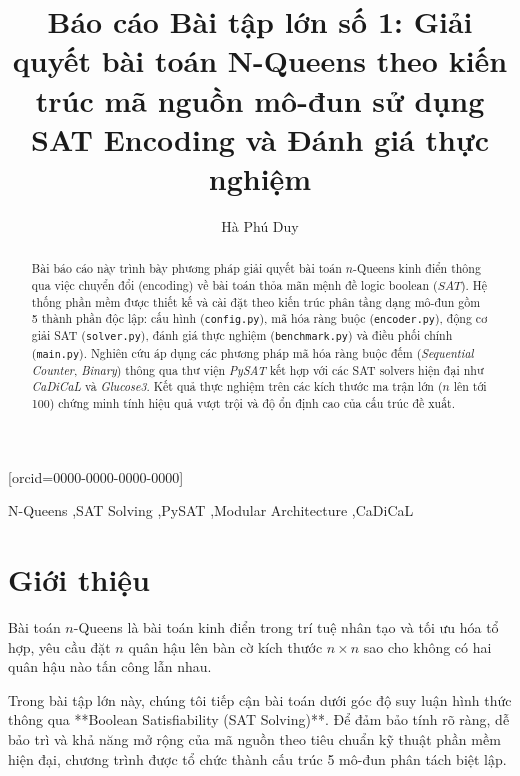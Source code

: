 \documentclass[a4paper,fleqn]{cas-sc}
\begin{document}
\let\WriteBookmarks\relax
\def\floatpagefraction{0.1}
\def\textfraction{0.1}


\begin{frontmatter}

\title{Báo cáo Bài tập lớn số 1: Giải quyết bài toán N-Queens theo kiến trúc mã nguồn mô-đun sử dụng SAT Encoding và Đánh giá thực nghiệm}

\author[1]{Hà Phú Duy}[orcid=0000-0000-0000-0000]
\cormark[1]

\address[1]{Khoa Công nghệ Thông tin, Trường Đại học Công nghệ, Đại học Quốc gia Hà Nội}

\begin{abstract}
Bài báo cáo này trình bày phương pháp giải quyết bài toán $n$-Queens kinh điển thông qua việc chuyển đổi (encoding) về bài toán thỏa mãn mệnh đề logic boolean ($SAT$). Hệ thống phần mềm được thiết kế và cài đặt theo kiến trúc phân tầng dạng mô-đun gồm 5 thành phần độc lập: cấu hình (\texttt{config.py}), mã hóa ràng buộc (\texttt{encoder.py}), động cơ giải SAT (\texttt{solver.py}), đánh giá thực nghiệm (\texttt{benchmark.py}) và điều phối chính (\texttt{main.py}). Nghiên cứu áp dụng các phương pháp mã hóa ràng buộc đếm (\textit{Sequential Counter}, \textit{Binary}) thông qua thư viện \textit{PySAT} kết hợp với các SAT solvers hiện đại như \textit{CaDiCaL} và \textit{Glucose3}. Kết quả thực nghiệm trên các kích thước ma trận lớn ($n$ lên tới 100) chứng minh tính hiệu quả vượt trội và độ ổn định cao của cấu trúc đề xuất.
\end{abstract}

\begin{keywords}
N-Queens \sep SAT Solving \sep PySAT \sep Modular Architecture \sep CaDiCaL
\end{keywords}

\end{frontmatter}

\section{Giới thiệu}
Bài toán $n$-Queens là bài toán kinh điển trong trí tuệ nhân tạo và tối ưu hóa tổ hợp, yêu cầu đặt $n$ quân hậu lên bàn cờ kích thước $n \times n$ sao cho không có hai quân hậu nào tấn công lẫn nhau.

Trong bài tập lớn này, chúng tôi tiếp cận bài toán dưới góc độ suy luận hình thức thông qua **Boolean Satisfiability (SAT Solving)**. Để đảm bảo tính rõ ràng, dễ bảo trì và khả năng mở rộng của mã nguồn theo tiêu chuẩn kỹ thuật phần mềm hiện đại, chương trình được tổ chức thành cấu trúc 5 mô-đun phân tách biệt lập.
\end{document}
